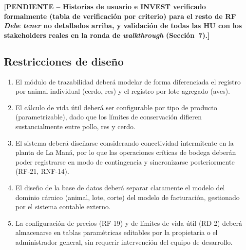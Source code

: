 \documentclass[11pt,a4paper]{article}
\newcommand{\PENDIENTE}[1]{\textcolor{pendiente}{\textbf{[PENDIENTE -- #1]}}}
\begin{document}


\PENDIENTE{Historias de usuario e INVEST verificado formalmente (tabla de verificación por criterio) para el resto de RF \textit{Debe tener} no detallados arriba, y validación de todas las HU con los stakeholders reales en la ronda de \textit{walkthrough} (Sección~7).}

\subsection{Restricciones de diseño}
\begin{enumerate}[nosep]
\item El módulo de trazabilidad deberá modelar de forma diferenciada el registro por animal individual (cerdo, res) y el registro por lote agregado (aves).
\item El cálculo de vida útil deberá ser configurable por tipo de producto (parametrizable), dado que los límites de conservación difieren sustancialmente entre pollo, res y cerdo.
\item El sistema deberá diseñarse considerando conectividad intermitente en la planta de La Maná, por lo que las operaciones críticas de bodega deberán poder registrarse en modo de contingencia y sincronizarse posteriormente (RF-21, RNF-14).
\item El diseño de la base de datos deberá separar claramente el modelo del dominio cárnico (animal, lote, corte) del modelo de facturación, gestionado por el sistema contable externo.
\item La configuración de precios (RF-19) y de límites de vida útil (RD-2) deberá almacenarse en tablas paramétricas editables por la propietaria o el administrador general, sin requerir intervención del equipo de desarrollo.
\end{enumerate}
\end{document}
